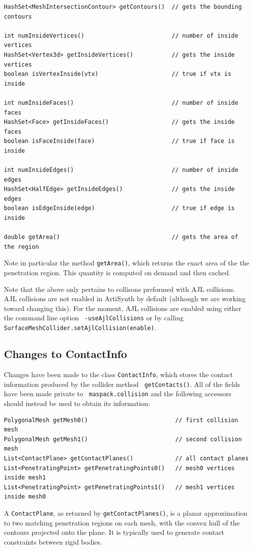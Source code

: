 \documentclass{article}
\begin{document}
%
\begin{lstlisting}[]
HashSet<MeshIntersectionContour> getContours()  // gets the bounding contours

int numInsideVertices()                         // number of inside vertices
HashSet<Vertex3d> getInsideVertices()           // gets the inside vertices
boolean isVertexInside(vtx)                     // true if vtx is inside

int numInsideFaces()                            // number of inside faces
HashSet<Face> getInsideFaces()                  // gets the inside faces
boolean isFaceInside(face)                      // true if face is inside

int numInsideEdges()                            // number of inside edges
HashSet<HalfEdge> getInsideEdges()              // gets the inside edges
boolean isEdgeInside(edge)                      // true if edge is inside

double getArea()                                // gets the area of the region
\end{lstlisting}
%

Note in particular the method {\tt getArea()}, which returns the exact
area of the the penetration region. This quantity is computed on
demand and then cached.

\begin{sideblock}
Note that the above only pertains to collisons preformed with AJL
collisions.  AJL collisions are not enabled in ArtiSynth by default
(although we are working toward changing this). For the moment, AJL
collisions are enabled using either the command line option {\tt
-useAjlCollisions} or by calling {\tt
SurfaceMeshCollider.setAjlCollision(enable)}.
\end{sideblock}

\subsection*{Changes to ContactInfo}

Changes have been made to the class {\tt ContactInfo}, which stores
the contact information produced by the collider method {\tt
getContacts()}. All of the fields have been made private to {\tt
maspack.collision} and the following accessors should instead be used
to obtain its information:
%
\begin{lstlisting}[]
PolygonalMesh getMesh0()                         // first collision mesh
PolygonalMesh getMesh1()                         // second collision mesh
List<ContactPlane> getContactPlanes()            // all contact planes
List<PenetratingPoint> getPenetratingPoints0()   // mesh0 vertices inside mesh1
List<PenetratingPoint> getPenetratingPoints1()   // mesh1 vertices inside mesh0
\end{lstlisting}
%
A {\tt ContactPlane}, as returned by {\tt getContactPlanes()}, is a
planar approximation to two matching penetration regions on each mesh,
with the convex hull of the contours projected onto the plane. It is
typically used to generate contact constraints between rigid bodies.
\end{document}
